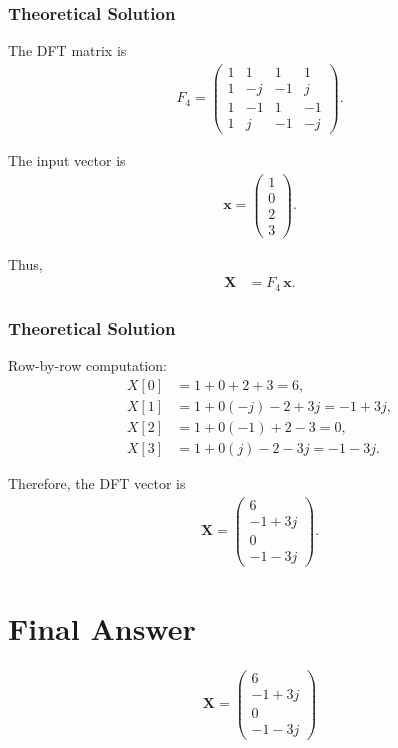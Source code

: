 \documentclass{beamer}
\theoremstyle{remark}
\newcommand{\myvec}[1]{\ensuremath{\begin{pmatrix}#1\end{pmatrix}}}
\let\vec\mathbf
\numberwithin{equation}{section}
\begin{document}
\begin{frame}
\frametitle{Theoretical Solution}
The DFT matrix is
\begin{align}
F_4 = \myvec{
1 & 1 & 1 & 1 \\
1 & -j & -1 & j \\
1 & -1 & 1 & -1 \\
1 & j & -1 & -j
}.
\end{align}

The input vector is
\begin{align}
\vec{x} = \myvec{1 \\ 0 \\ 2 \\ 3}.
\end{align}

Thus,
\begin{align}
\vec{X} &= F_4 \, \vec{x}.
\end{align}

\end{frame}

\begin{frame}
\frametitle{Theoretical Solution}
Row-by-row computation:
\begin{align}
X[0] &= 1+0+2+3 = 6, \\
X[1] &= 1 + 0(-j) - 2 + 3j = -1+3j, \\
X[2] &= 1 + 0(-1) + 2 - 3 = 0, \\
X[3] &= 1 + 0(j) - 2 - 3j = -1-3j.
\end{align}

Therefore, the DFT vector is
\begin{align}
\vec{X} = \myvec{6 \\ -1+3j \\ 0 \\ -1-3j}.
\end{align}

\section*{Final Answer}
\begin{align}
\vec{X} = \myvec{6 \\ -1+3j \\ 0 \\ -1-3j}
\end{align}

\end{frame}
\end{document}
